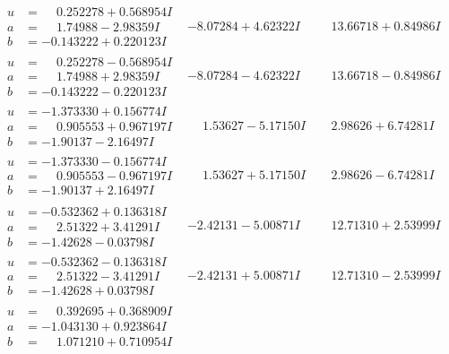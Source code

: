 \documentclass[1p]{elsarticle_modified}
\theoremstyle{definition}
\begin{document}
$$\begin{array}{c|c|c}
\begin{aligned}
u &= \phantom{-}0.252278 + 0.568954 I \\
a &= \phantom{-}1.74988 - 2.98359 I \\
b &= -0.143222 + 0.220123 I\end{aligned}
 & -8.07284 + 4.62322 I & \phantom{-}13.66718 + 0.84986 I \\ \hline\begin{aligned}
u &= \phantom{-}0.252278 - 0.568954 I \\
a &= \phantom{-}1.74988 + 2.98359 I \\
b &= -0.143222 - 0.220123 I\end{aligned}
 & -8.07284 - 4.62322 I & \phantom{-}13.66718 - 0.84986 I \\ \hline\begin{aligned}
u &= -1.373330 + 0.156774 I \\
a &= \phantom{-}0.905553 + 0.967197 I \\
b &= -1.90137 - 2.16497 I\end{aligned}
 & \phantom{-}1.53627 - 5.17150 I & \phantom{-}2.98626 + 6.74281 I \\ \hline\begin{aligned}
u &= -1.373330 - 0.156774 I \\
a &= \phantom{-}0.905553 - 0.967197 I \\
b &= -1.90137 + 2.16497 I\end{aligned}
 & \phantom{-}1.53627 + 5.17150 I & \phantom{-}2.98626 - 6.74281 I \\ \hline\begin{aligned}
u &= -0.532362 + 0.136318 I \\
a &= \phantom{-}2.51322 + 3.41291 I \\
b &= -1.42628 - 0.03798 I\end{aligned}
 & -2.42131 - 5.00871 I & \phantom{-}12.71310 + 2.53999 I \\ \hline\begin{aligned}
u &= -0.532362 - 0.136318 I \\
a &= \phantom{-}2.51322 - 3.41291 I \\
b &= -1.42628 + 0.03798 I\end{aligned}
 & -2.42131 + 5.00871 I & \phantom{-}12.71310 - 2.53999 I \\ \hline\begin{aligned}
u &= \phantom{-}0.392695 + 0.368909 I \\
a &= -1.043130 + 0.923864 I \\
b &= \phantom{-}1.071210 + 0.710954 I\end{aligned}

\end{array}$$
\end{document}

